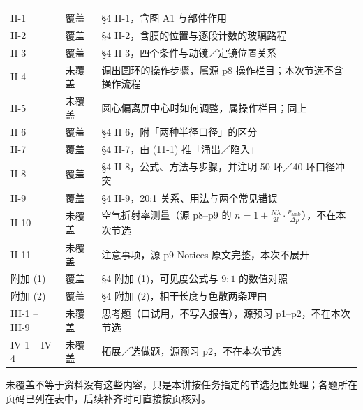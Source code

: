 \documentclass[11pt]{ctexart}
\begin{document}
{\small
\begin{longtable}{@{}C{1.8cm}C{1.3cm}L{12.6cm}@{}}
\toprule
{} &  &  \\
\midrule
\endfirsthead
\toprule
{} &  &  \\
\midrule
\endhead
\bottomrule
\endlastfoot
II-1 & 覆盖 & §4 II-1，含图 A1 与部件作用 \\
II-2 & 覆盖 & §4 II-2，含膜的位置与逐段计数的玻璃路程 \\
II-3 & 覆盖 & §4 II-3，四个条件与动镜／定镜位置关系 \\
II-4 & 未覆盖 & 调出圆环的操作步骤，属源 p8 操作栏目；本次节选不含操作流程 \\
II-5 & 未覆盖 & 圆心偏离屏中心时如何调整，属操作栏目；同上 \\
II-6 & 覆盖 & §4 II-6，附「两种半径口径」的区分 \\
II-7 & 覆盖 & §4 II-7，由 (11-1) 推「涌出／陷入」 \\
II-8 & 覆盖 & §4 II-8，公式、方法与步骤，并注明 50 环／40 环口径冲突 \\
II-9 & 覆盖 & §4 II-9，20:1 关系、用法与两个常见错误 \\
II-10 & 未覆盖 & 空气折射率测量（源 p8--p9 的 $n=1+\frac{N\lambda}{2l}\cdot\frac{p_{\mathrm{amb}}}{\Delta p}$），不在本次节选 \\
II-11 & 未覆盖 & 注意事项，源 p9 Notices 原文完整，本次不展开 \\
附加 (1) & 覆盖 & §4 附加 (1)，可见度公式与 $9:1$ 的数值对照 \\
附加 (2) & 覆盖 & §4 附加 (2)，相干长度与色散两条理由 \\
III-1 -- III-9 & 未覆盖 & 思考题（口试用，不写入报告），源预习 p1--p2，不在本次节选 \\
IV-1 -- IV-4 & 未覆盖 & 拓展／选做题，源预习 p2，不在本次节选 \\
\end{longtable}}

未覆盖不等于资料没有这些内容，只是本讲按任务指定的节选范围处理；各题所在页码已列在表中，后续补齐时可直接按页核对。

\end{document}
